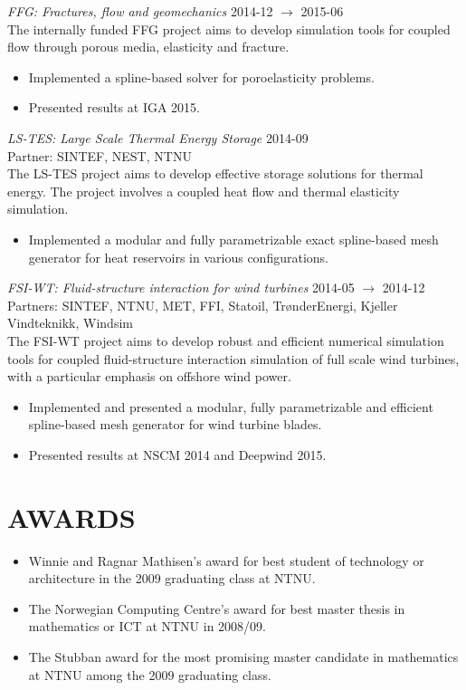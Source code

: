 \documentclass[line,margin]{res}
\begin{document}
\begin{resume}
{\em FFG: Fractures, flow and geomechanics} \hfill 2014-12 $\to$ 2015-06 \\
The internally funded FFG project aims to develop simulation tools for coupled
flow through porous media, elasticity and fracture.
\begin{itemize}
\item Implemented a spline-based solver for poroelasticity problems.
\item Presented results at  IGA 2015.
\end{itemize}

{\em LS-TES: Large Scale Thermal Energy Storage} \hfill 2014-09 \\
{\small Partner: SINTEF, NEST, NTNU} \\
The LS-TES project aims to develop effective storage solutions for thermal
energy. The project involves a coupled heat flow and thermal elasticity
simulation.
\begin{itemize}
\item Implemented a modular and fully parametrizable exact spline-based mesh
  generator for heat reservoirs in various configurations.
\end{itemize}

{\em FSI-WT: Fluid-structure interaction for wind turbines}
\hfill 2014-05 $\to$ 2014-12 \\
{\small Partners: SINTEF, NTNU, MET, FFI, Statoil, TrønderEnergi, Kjeller Vindteknikk, Windsim} \\
The FSI-WT project aims to develop robust and efficient numerical simulation
tools for coupled fluid-structure interaction simulation of full scale wind
turbines, with a particular emphasis on offshore wind power.
\begin{itemize}
\item Implemented and presented a modular, fully parametrizable and efficient
  spline-based mesh generator for wind turbine blades.
\item Presented results at  NSCM 2014 and  Deepwind 2015.
\end{itemize}


\section{AWARDS}

\begin{itemize}
\item Winnie and Ragnar Mathisen's award for best student of technology
  or architecture in the 2009 graduating class at NTNU.
\item The Norwegian Computing Centre's award for best master thesis in
  mathematics or ICT at NTNU in 2008/09.
\item The Stubban award for the most promising master candidate in
  mathematics at NTNU among the 2009 graduating class.
\end{itemize}



\end{resume}
\end{document}
